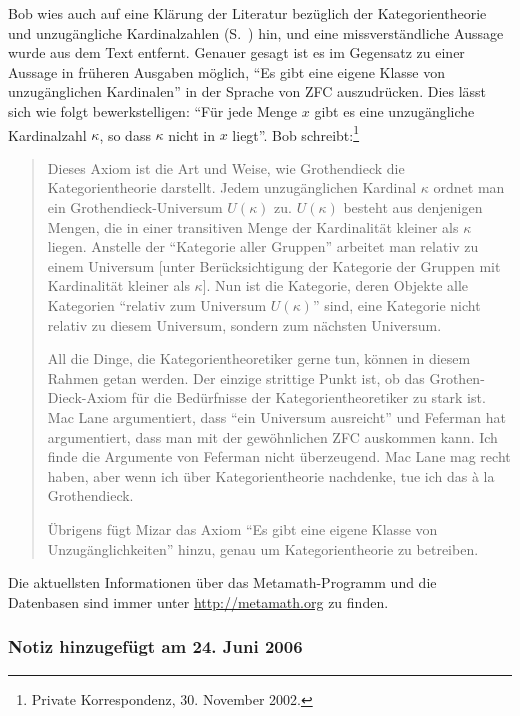 Bob wies auch auf eine Klärung der Literatur bezüglich der Kategorientheorie und unzugängliche Kardinalzahlen (S.~\pageref{categoryth}) hin, und eine missverständliche Aussage wurde aus dem Text entfernt.  Genauer gesagt ist es im Gegensatz zu einer Aussage in früheren Ausgaben möglich, "`Es gibt eine eigene Klasse von unzugänglichen Kardinalen"' in der Sprache von ZFC auszudrücken.  Dies lässt sich wie folgt bewerkstelligen:  "`Für jede Menge $x$ gibt es eine unzugängliche Kardinalzahl $\kappa$, so dass $\kappa$ nicht in $x$ liegt"'. Bob schreibt:\footnote{Private Korrespondenz, 30. November 2002.}
\begin{quotation}
  
  Dieses Axiom ist die Art und Weise, wie Grothendieck die Kategorientheorie darstellt.  Jedem unzugänglichen Kardinal $\kappa$ ordnet man ein Grothendieck-Universum  $U(\kappa)$ zu. $U(\kappa)$ besteht aus denjenigen Mengen, die in einer transitiven Menge der Kardinalität kleiner als $\kappa$ liegen.  Anstelle der "`Kategorie aller Gruppen"' arbeitet man relativ zu einem Universum [unter Berücksichtigung der Kategorie der Gruppen mit Kardinalität kleiner als $\kappa$].  Nun ist die Kategorie, deren Objekte alle Kategorien "`relativ zum Universum $U(\kappa)$"' sind, eine Kategorie nicht relativ zu diesem Universum, sondern zum nächsten Universum.
  
  All die Dinge, die Kategorientheoretiker gerne tun, können in diesem Rahmen getan werden.  Der einzige strittige Punkt ist, ob das Grothen-Dieck-Axiom für die Bedürfnisse der Kategorientheoretiker zu stark ist.  Mac Lane  argumentiert, dass "`ein Universum ausreicht"' und Feferman hat argumentiert, dass man mit der gewöhnlichen ZFC auskommen kann.  Ich finde die Argumente von Feferman nicht überzeugend.  Mac Lane mag recht haben, aber wenn ich über Kategorientheorie nachdenke, tue ich das \`{a} la Grothendieck.
  
  Übrigens fügt Mizar das Axiom "`Es gibt eine eigene Klasse von Unzugänglichkeiten"' hinzu, genau um Kategorientheorie zu betreiben.

\end{quotation}

Die aktuellsten Informationen über das Metamath-Programm und die Datenbasen sind immer unter \url{http://metamath.org} zu finden.


\subsubsection{Notiz hinzugefügt am 24. Juni 2006}\label{note2006}

